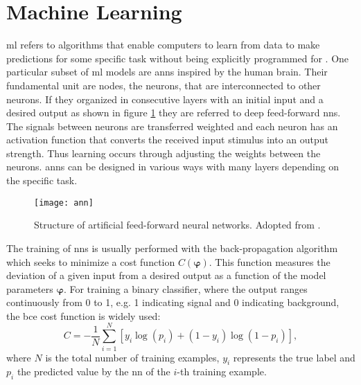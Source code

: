 
\section{Machine Learning}
\ac{ml} refers to algorithms that enable computers to learn from data to make predictions for some specific task without being explicitly programmed for \citep{kubat2021introduction}. One particular subset of \ac{ml} models are \acp{ann} inspired by the human brain. Their fundamental unit are nodes, the neurons, that are interconnected to other neurons. If they organized in consecutive layers with an initial input and a desired output as shown in figure \ref{fig:ann} they are referred to deep feed-forward \acp{nn}. The signals between neurons are transferred weighted and each neuron has an activation function that converts the received input stimulus into an output strength. Thus learning occurs through adjusting the weights between the neurons. \acp{ann} can be designed in various ways with many layers depending on the specific task.
\begin{figure}
    \centering
    \texttt{[image: ann]}
    \caption[]{Structure of artificial feed-forward neural networks. Adopted from \citep{8114708}.}
    \label{fig:ann}
\end{figure}

The training of \acp{nn} is usually performed with the back-propagation algorithm which seeks to minimize a cost function $C(\bm{\varphi})$. This function measures the deviation of a given input from a desired output as a function of the model parameters $\bm{\varphi}$. For training a binary classifier, where the output ranges continuously from 0 to 1, e.g. 1 indicating signal and 0 indicating background, the \ac{bce} cost function is widely used:
\begin{equation}\label{eq
    }
    C = -\frac{1}{N} \sum_{i=1}^{N} \left[ y_i \log(p_i) + (1 - y_i) \log(1 - p_i) \right],
\end{equation}
where $N$ is the total number of training examples, $y_i$ represents the true label and $p_i$ the predicted value by the \ac{nn} of the $i$-th training example.

